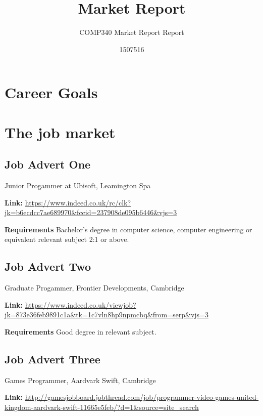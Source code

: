 \documentclass{scrartcl}
\title{Market Report}
\subtitle{COMP340 Market Report Report}
\author{1507516}
\begin{document}
\maketitle


\section{Career Goals}

\section{The job market}


\subsection{Job Advert One}
Junior Progammer at Ubisoft, Leamington Spa

\textbf{Link: }
\url{https://www.indeed.co.uk/rc/clk?jk=b6ecdcc7ae689970&fccid=237908de095b6446&vjs=3}

\textbf{Requirements}
Bachelor's degree in computer science, computer engineering or equivalent relevant subject 2:1 or above.

\subsection{Job Advert Two}
Graduate Progammer, Frontier Developments, Cambridge

\textbf{Link: }
\url{https://www.indeed.co.uk/viewjob?jk=873e36feb9891c1a&tk=1c7vln8hp9npmcbq&from=serp&vjs=3}

\textbf{Requirements}
Good degree in relevant subject.

\subsection{Job Advert Three}
Games Programmer, Aardvark Swift, Cambridge

\textbf{Link:}
\url{http://gamesjobboard.jobthread.com/job/programmer-video-games-united-kingdom-aardvark-swift-11665e5feb/?d=1&source=site_search}
\end{document}
